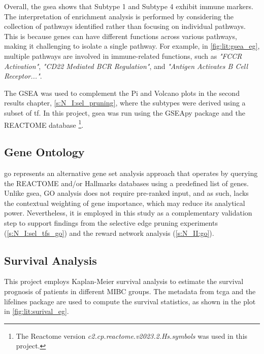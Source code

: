Overall, the \acrshort{gsea} shows that Subtype 1 and Subtype 4 exhibit immune markers. The interpretation of enrichment analysis is performed by considering the collection of pathways identified rather than focusing on individual pathways. This is because genes can have different functions across various pathways, making it challenging to isolate a single pathway. For example, in \cref{fig:lit:gsea_eg}, multiple pathways are involved in immune-related functions, such as \textit{"FCCR Activation"}, \textit{"CD22 Mediated BCR Regulation"}, and \textit{"Antigen Activates B Cell Receptor..."}. 

The GSEA was used to complement the Pi and Volcano plots in the second results chapter, \cref{s:N_I:sel_pruning}, where the subtypes were derived using a subset of \acrlong{tf}. In this project, \acrfull{gsea} was run using the GSEApy package \citep{Fang2023-ec} and the REACTOME database \cite{Milacic2024-yt}\footnote{The Reactome version \textit{c2.cp.reactome.v2023.2.Hs.symbols} was used in this project.}.

\subsection{Gene Ontology} \label{s:lit:go}

\acrfull{go} represents an alternative gene set analysis approach that operates by querying the REACTOME and/or Hallmarks databases using a predefined list of genes. Unlike \acrshort{gsea}, GO analysis does not require pre-ranked input, and as such, lacks the contextual weighting of gene importance, which may reduce its analytical power. Nevertheless, it is employed in this study as a complementary validation step to support findings from the selective edge pruning experiments (\cref{s:N_I:sel_tfs_go}) and the reward network analysis (\cref{s:N_II:go}).


\subsection{Survival Analysis} \label{s:lit:survival}

This project employs Kaplan-Meier survival analysis \cite{Kaplan1958-iy} to estimate the survival prognosis of patients in different MIBC groups. The metadata from \acrlong{tcga} and the lifelines package \citep{Davidson-Pilon2019-fu} are used to compute the survival statistics, as shown in the plot in \cref{fig:lit:surival_eg}.

